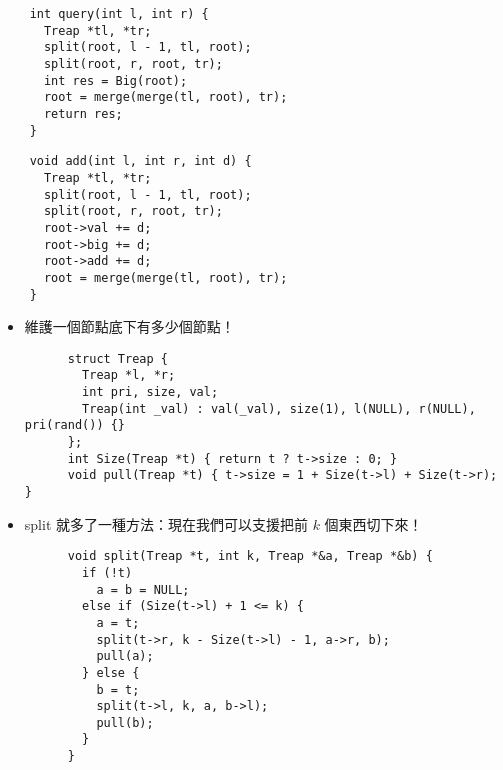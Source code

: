 \documentclass[standalone]{beamer}
\begin{document}
\begin{frame}[fragile]{}
  \begin{verbatim}
    int query(int l, int r) {
      Treap *tl, *tr;
      split(root, l - 1, tl, root);
      split(root, r, root, tr);
      int res = Big(root);
      root = merge(merge(tl, root), tr);
      return res;
    }
  \end{verbatim}
\end{frame}

\begin{frame}[fragile]{}
  \begin{verbatim}
    void add(int l, int r, int d) {
      Treap *tl, *tr;
      split(root, l - 1, tl, root);
      split(root, r, root, tr);
      root->val += d;
      root->big += d;
      root->add += d;
      root = merge(merge(tl, root), tr);
    }
  \end{verbatim}
\end{frame}

\begin{frame}[fragile]{}
  \begin{itemize}
    \item 維護一個節點底下有多少個節點！
    \begin{verbatim}
      struct Treap {
        Treap *l, *r;
        int pri, size, val;
        Treap(int _val) : val(_val), size(1), l(NULL), r(NULL), pri(rand()) {}
      };
      int Size(Treap *t) { return t ? t->size : 0; }
      void pull(Treap *t) { t->size = 1 + Size(t->l) + Size(t->r); }
    \end{verbatim}
  \end{itemize}
\end{frame}

\begin{frame}[fragile]{}
  \begin{itemize}
    \item split 就多了一種方法：現在我們可以支援把前 $k$ 個東西切下來！
    \begin{verbatim}
      void split(Treap *t, int k, Treap *&a, Treap *&b) {
        if (!t)
          a = b = NULL;
        else if (Size(t->l) + 1 <= k) {
          a = t;
          split(t->r, k - Size(t->l) - 1, a->r, b);
          pull(a);
        } else {
          b = t;
          split(t->l, k, a, b->l);
          pull(b);
        }
      }
    \end{verbatim}
  \end{itemize}
\end{frame}
\end{document}
